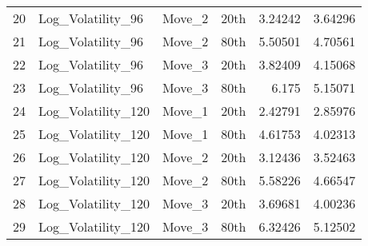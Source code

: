 \begin{tabular}{rlllrr}
 20 & Log\_Volatility\_96   & Move\_2        & 20th         & 3.24242 & 3.64296 \\
 21 & Log\_Volatility\_96   & Move\_2        & 80th         & 5.50501 & 4.70561 \\
 22 & Log\_Volatility\_96   & Move\_3        & 20th         & 3.82409 & 4.15068 \\
 23 & Log\_Volatility\_96   & Move\_3        & 80th         & 6.175   & 5.15071 \\
 24 & Log\_Volatility\_120  & Move\_1        & 20th         & 2.42791 & 2.85976 \\
 25 & Log\_Volatility\_120  & Move\_1        & 80th         & 4.61753 & 4.02313 \\
 26 & Log\_Volatility\_120  & Move\_2        & 20th         & 3.12436 & 3.52463 \\
 27 & Log\_Volatility\_120  & Move\_2        & 80th         & 5.58226 & 4.66547 \\
 28 & Log\_Volatility\_120  & Move\_3        & 20th         & 3.69681 & 4.00236 \\
 29 & Log\_Volatility\_120  & Move\_3        & 80th         & 6.32426 & 5.12502 \\
\hline
\end{tabular}